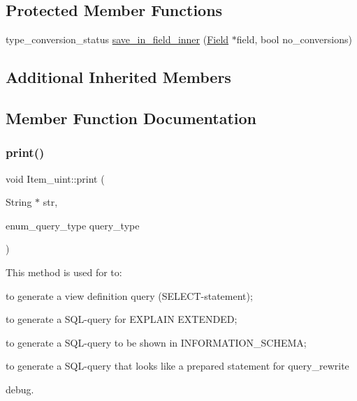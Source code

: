 \subsection*{Protected Member Functions}
\begin{DoxyCompactItemize}
\item 
type\+\_\+conversion\+\_\+status \mbox{\hyperlink{classItem__uint_a91382bc23286fc3fcd9fdab10dce8567}{save\+\_\+in\+\_\+field\+\_\+inner}} (\mbox{\hyperlink{classField}{Field}} $\ast$field, bool no\+\_\+conversions)
\end{DoxyCompactItemize}
\subsection*{Additional Inherited Members}


\subsection{Member Function Documentation}
\mbox{\label{classItem__uint_a24c54d4822268228386af4160895372c}} 
\subsubsection{\texorpdfstring{print()}{print()}}
{\footnotesize\ttfamily void Item\+\_\+uint\+::print (\begin{DoxyParamCaption}\item[{String $\ast$}]{str,  }\item[{enum\+\_\+query\+\_\+type}]{query\+\_\+type }\end{DoxyParamCaption})\hspace{0.3cm}{\ttfamily [virtual]}}

This method is used for to\+:
\begin{DoxyItemize}
\item to generate a view definition query (S\+E\+L\+E\+CT-\/statement);
\item to generate a S\+QL-\/query for E\+X\+P\+L\+A\+IN E\+X\+T\+E\+N\+D\+ED;
\item to generate a S\+QL-\/query to be shown in I\+N\+F\+O\+R\+M\+A\+T\+I\+O\+N\+\_\+\+S\+C\+H\+E\+MA;
\item to generate a S\+QL-\/query that looks like a prepared statement for query\+\_\+rewrite
\item debug.
\end{DoxyItemize}

